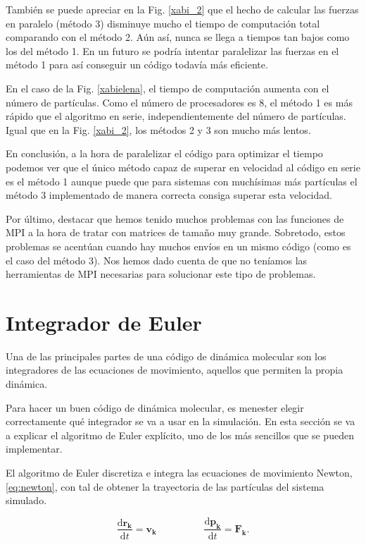 \documentclass[onecolumn]{article}
\renewcommand{\vec}[1]{\mathbf{#1}}
\renewcommand{\d}{\text{d}}
\begin{document}
También se puede apreciar en la Fig. \ref{xabi_2} que el hecho de calcular las fuerzas en paralelo (método 3) disminuye mucho el tiempo de computación total comparando con el método 2. Aún así, nunca se llega a tiempos tan bajos como los del método 1. En un futuro se podría intentar paralelizar las fuerzas en el método 1 para así conseguir un código todavía más eficiente.

En el caso de la Fig. \ref{xabielena}, el tiempo de computación aumenta con el número de partículas. Como el número de procesadores es 8, el método 1 es más rápido que el algoritmo en serie, independientemente del número de partículas.  Igual que en la Fig. \ref{xabi_2}, los métodos 2 y 3 son mucho más lentos. 

En conclusión, a la hora de paralelizar el código para optimizar el tiempo podemos ver que el único método capaz de superar en velocidad al código en serie es el método 1 aunque puede que para sistemas con muchísimas más partículas el método 3 implementado de manera correcta consiga superar esta velocidad.

Por último, destacar que hemos tenido muchos problemas con las funciones de MPI a la hora de tratar con matrices de tamaño muy grande. Sobretodo, estos problemas se acentúan cuando hay muchos envíos en un mismo código (como es el caso del método 3). Nos hemos dado cuenta de que no teníamos las herramientas de MPI necesarias para solucionar este tipo de problemas.



\section{Integrador de Euler}

Una de las principales partes de una código de dinámica molecular son los integradores de las ecuaciones de movimiento,
aquellos que permiten la propia dinámica.

Para hacer un buen código de dinámica molecular, es menester elegir correctamente qué integrador se va a usar en la simulación.
En esta sección se va a explicar el algoritmo de Euler explícito, uno de los más sencillos que se pueden implementar.

El algoritmo de Euler discretiza e integra las ecuaciones de movimiento Newton, \eqref{eq:newton}, con tal de obtener la trayectoria de las partículas
del sistema simulado.

\begin{equation}\label{eq:newton}
\frac{\d\vec{r_k}}{\d t} = \vec{v_k}\hspace{2cm} \frac{\d\vec{p_k}}{\d t} = \vec{F_k} .
\end{equation}
\end{document}
